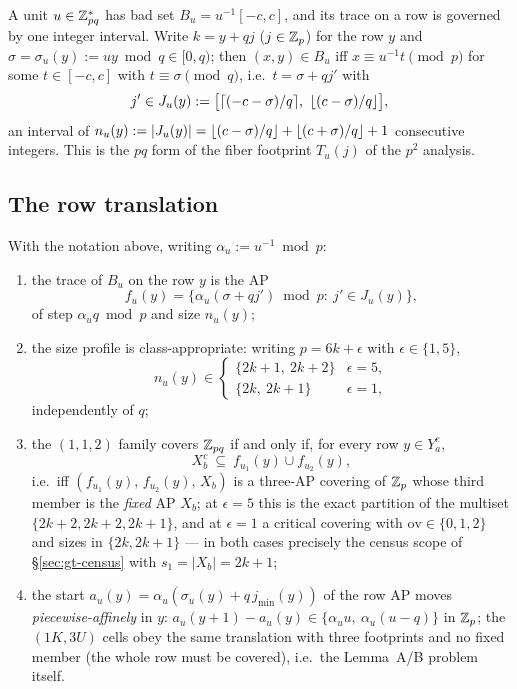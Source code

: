 A unit $u\in\mathbb{Z}_{pq}^{*}$ has bad set $B_u=u^{-1}[-c,c]$, and its trace on a
row is governed by one integer interval. Write $k=y+qj$ ($j\in\mathbb{Z}_p$) for the
row $y$ and $\sigma=\sigma_u(y):=uy\bmod q\in[0,q)$; then
$(x,y)\in B_u$ iff $x\equiv u^{-1}t\pmod p$ for some $t\in[-c,c]$ with
$t\equiv\sigma\pmod q$, i.e.\ $t=\sigma+qj'$ with
\begin{equation}\label{eq:Jinterval}
j'\in J_u(y):=\bigl[\lceil(-c-\sigma)/q\rceil,\ \floor{(c-\sigma)/q}\bigr],
\end{equation}
an interval of $n_u(y):=|J_u(y)|=\left\lfloor (c-\sigma)/q \right\rfloor+\left\lfloor (c+\sigma)/q \right\rfloor+1$
consecutive integers. This is the $pq$ form of the fiber footprint
$T_u(j)$ of the $p^2$ analysis.

\subsection{The row translation}\label{sec:pq-thm}

\begin{theorem}[row translation at $N=pq$]\label{thm:R}
With the notation above, writing $\alpha_u:=u^{-1}\bmod p$:
\begin{enumerate}[leftmargin=1.9em,itemsep=2pt]
\item[\textup{(i)}] the trace of $B_u$ on the row $y$ is the AP
\[
f_u(y)=\{\alpha_u(\sigma+qj')\bmod p:\ j'\in J_u(y)\},
\]
of step $\alpha_u q\bmod p$ and size $n_u(y)$;
\item[\textup{(ii)}] the size profile is class-appropriate: writing
$p=6k+\epsilon$ with $\epsilon\in\{1,5\}$,
\[
n_u(y)\in
\begin{cases}
\{2k+1,\ 2k+2\}&\epsilon=5,\\
\{2k,\ 2k+1\}&\epsilon=1,
\end{cases}
\]
independently of $q$;
\item[\textup{(iii)}] the $(1,1,2)$ family covers $\mathbb{Z}_{pq}$ if and only if,
for every row $y\in Y_a^{c}$,
\[
X_b^{c}\ \subseteq\ f_{u_1}(y)\cup f_{u_2}(y),
\]
i.e.\ iff $(f_{u_1}(y),\,f_{u_2}(y),\,X_b)$ is a three-AP covering of
$\mathbb{Z}_p$ whose third member is the \emph{fixed} AP $X_b$; at $\epsilon=5$ this
is the exact partition of the multiset $\{2k{+}2,2k{+}2,2k{+}1\}$, and at
$\epsilon=1$ a critical covering with $\mathrm{ov}\in\{0,1,2\}$ and sizes in
$\{2k,2k{+}1\}$ --- in both cases precisely the census scope of
\S\ref{sec:gt-census} with $s_1=|X_b|=2k+1$;
\item[\textup{(iv)}] the start $a_u(y)=\alpha_u(\sigma_u(y)+q\,j_{\min}(y))$
of the row AP moves \emph{piecewise-affinely} in $y$:
$a_u(y{+}1)-a_u(y)\in\{\alpha_u u,\ \alpha_u(u-q)\}$ in $\mathbb{Z}_p$; the
$(1K,3U)$ cells obey the same translation with three footprints and no fixed
member (the whole row must be covered), i.e.\ the Lemma~A/B problem itself.
\end{enumerate}
\end{theorem}

